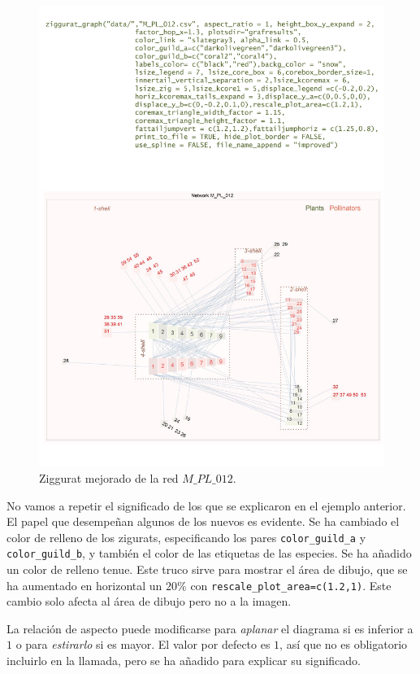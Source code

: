 \clearpage
\begin{figure}[hbt!]
\centering
\includegraphics[scale=0.8]{ManFigs/M_PL_012_ziggurat_improved.pdf}
\caption {Ziggurat mejorado de la red $M\_PL\_012$.}
\label{fig:AKMAN_ziggurat_012_improved}
\end{figure}

\clearpage
No vamos a repetir el significado de los que se explicaron en el ejemplo anterior. El papel que desempeñan algunos de los nuevos
es evidente. Se ha cambiado el color de relleno de los zigurats, especificando los pares \texttt{color\_guild\_a} y \texttt{color\_guild\_b},
y también el color de las etiquetas de las especies. Se ha añadido un color de relleno tenue. Este truco sirve para mostrar el área de dibujo, que se ha aumentado en horizontal un $20\%$ con \texttt{rescale\_plot\_area=c(1.2,1)}. Este cambio solo afecta al área de dibujo pero no a la imagen. 

La relación de aspecto puede modificarse para \textit{aplanar} el diagrama si es inferior a $1$ o para \textit{estirarlo} si es mayor. El valor por defecto es $1$, así que no es obligatorio incluirlo en la llamada, pero se ha añadido para explicar su significado.

